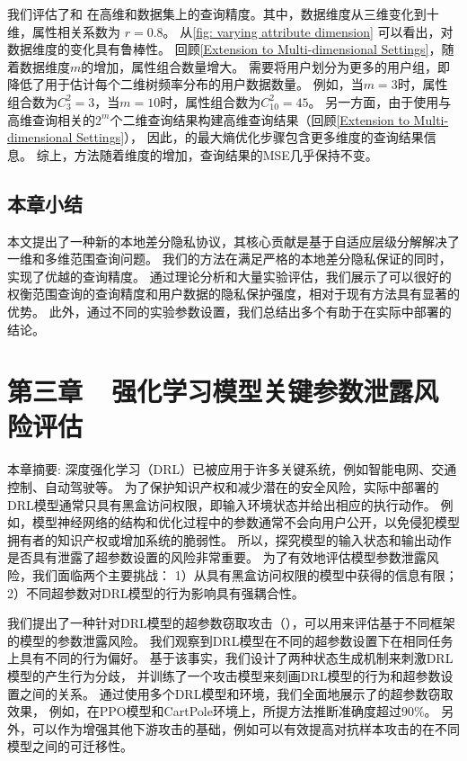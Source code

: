 我们评估了\myahead 和 \myHDG 在高维\Laplacian 和\Gaussian 数据集上的查询精度。其中，数据维度从三维变化到十维，属性相关系数为 $r=0.8$。
从\autoref{fig: varying attribute dimension} 可以看出，\myahead 对数据维度的变化具有鲁棒性。
回顾\autoref{Extension to Multi-dimensional Settings}，随着数据维度$m$的增加，属性组合数量增大。
\lle 需要将用户划分为更多的用户组，即降低了用于估计每个二维\myahead 树频率分布的用户数据数量。
例如，当$m=3$时，属性组合数为$C_3^2=3$，当$m=10$时，属性组合数为$C_{10}^2=45$。
另一方面，由于\lle 使用与高维查询相关的$2^m$个二维查询结果构建高维查询结果（回顾\autoref{Extension to Multi-dimensional Settings}），
因此，\lle 的最大熵优化步骤包含更多维度的查询结果信息。
综上，\lle 方法随着维度的增加，查询结果的MSE几乎保持不变。

\section{本章小结}
本文提出了一种新的本地差分隐私协议，其核心贡献是基于自适应层级分解解决了一维和多维范围查询问题。
我们的方法在满足严格的本地差分隐私保证的同时，实现了优越的查询精度。
通过理论分析和大量实验评估，我们展示了\myahead 可以很好的权衡范围查询的查询精度和用户数据的隐私保护强度，相对于现有方法具有显著的优势。
此外，通过不同的实验参数设置，我们总结出多个有助于在实际中部署\myahead 的结论。





\chapter{第三章~~强化学习模型关键参数泄露风险评估}

本章摘要: 
深度强化学习（DRL）已被应用于许多关键系统，例如智能电网、交通控制、自动驾驶等。
为了保护知识产权和减少潜在的安全风险，实际中部署的DRL模型通常只具有黑盒访问权限，即输入环境状态并给出相应的执行动作。
例如，模型神经网络的结构和优化过程中的参数通常不会向用户公开，以免侵犯模型拥有者的知识产权或增加系统的脆弱性。
所以，探究模型的输入状态和输出动作是否具有泄露了超参数设置的风险非常重要。
为了有效地评估模型参数泄露风险，我们面临两个主要挑战：
1）从具有黑盒访问权限的模型中获得的信息有限；
2）不同超参数对DRL模型的行为影响具有强耦合性。

我们提出了一种针对DRL模型的超参数窃取攻击（\sysname），可以用来评估基于不同框架的模型的参数泄露风险。
我们观察到DRL模型在不同的超参数设置下在相同任务上具有不同的行为偏好。
基于该事实，我们设计了两种状态生成机制来刺激DRL模型的产生行为分歧，
并训练了一个攻击模型来刻画DRL模型的行为和超参数设置之间的关系。
通过使用多个DRL模型和环境，我们全面地展示了\sysname 的超参数窃取效果，
例如，在PPO模型和CartPole环境上，所提方法推断准确度超过$90\%$。
另外，\sysname 可以作为增强其他下游攻击的基础，例如\sysname 可以有效提高对抗样本攻击的在不同模型之间的可迁移性。

